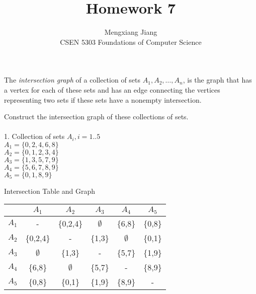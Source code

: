 \documentclass[12pt]{article}
\newenvironment{problem}[2][Problem]{\begin{trivlist}
\item[\hskip \labelsep {\bfseries #1}\hskip \labelsep {\bfseries #2.}]}{\end{trivlist}}
\begin{document}
 
 
\title{Homework 7}%
\author{Mengxiang Jiang\\ %
CSEN 5303 Foundations of Computer Science} %
 
\maketitle

\begin{problem}{1}
    The \emph{intersection graph} of a collection of sets $A_1, A_2, \ldots, A_n$, is the graph that has a
vertex for each of these sets and has an edge connecting the vertices representing two sets if these
sets have a nonempty intersection.

Construct the intersection graph of these collections of sets.\\\\
1. Collection of sets $A_i, i=1..5$\\
$A_1 = \{0,2,4,6,8\}$\\
$A_2 = \{0,1,2,3,4\}$\\
$A_3 = \{1,3,5,7,9\}$\\
$A_4 = \{5,6,7,8,9\}$\\
$A_5 = \{0,1,8,9\}$
\begin{center}
    Intersection Table and Graph\\
    \begin{tabular}{|c|c|c|c|c|c|} 
     \hline
      & $A_1$ & $A_2$ & $A_3$ & $A_4$ & $A_5$\\
     \hline
     $A_1$ & - & \{0,2,4\} & $\emptyset$ & \{6,8\} & \{0,8\}\\ 
     $A_2$ & \{0,2,4\} & - & \{1,3\} & $\emptyset$ & \{0,1\}\\
     $A_3$ & $\emptyset$ & \{1,3\} & - & \{5,7\} & \{1,9\}\\
     $A_4$ & \{6,8\} & $\emptyset$ & \{5,7\} & - & \{8,9\} \\
     $A_5$ & \{0,8\} & \{0,1\} & \{1,9\} & \{8,9\} & - \\
     \hline
    \end{tabular}

\end{center}
\end{problem}
\end{document}
